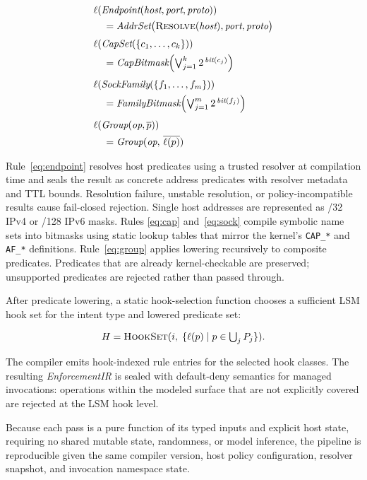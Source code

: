 \begin{align}
&\ell(\textit{Endpoint}(\textit{host}, \textit{port}, \textit{proto}))
  \notag\\
&\quad= \textit{AddrSet}\bigl(
    \textsc{Resolve}(\textit{host}),
    \textit{port},
    \textit{proto}
  \bigr)
  \label{eq:endpoint} \\[3pt]
&\ell(\textit{CapSet}(\{c_1, \ldots, c_k\}))
  \notag\\
&\quad= \textit{CapBitmask}\!\left(
    \textstyle\bigvee_{j=1}^{k} 2^{\,\textit{bit}(c_j)}
  \right)
  \label{eq:cap} \\[3pt]
&\ell(\textit{SockFamily}(\{f_1, \ldots, f_m\}))
  \notag\\
&\quad= \textit{FamilyBitmask}\!\left(
    \textstyle\bigvee_{j=1}^{m} 2^{\,\textit{bit}(f_j)}
  \right)
  \label{eq:sock} \\[3pt]
&\ell(\textit{Group}(\textit{op}, \overline{p}))
  \notag\\
&\quad= \textit{Group}(\textit{op},\, \overline{\ell(p)})
  \label{eq:group}
\end{align}

\noindent Rule~\eqref{eq:endpoint} resolves host predicates using a trusted
resolver at compilation time and seals the result as concrete address
predicates with resolver metadata and TTL bounds. Resolution failure, unstable
resolution, or policy-incompatible results cause fail-closed rejection. Single
host addresses are represented as /32 IPv4 or /128 IPv6 masks. Rules
\eqref{eq:cap} and~\eqref{eq:sock} compile symbolic name sets into bitmasks
using static lookup tables that mirror the kernel's \texttt{CAP\_*} and
\texttt{AF\_*} definitions. Rule~\eqref{eq:group} applies lowering recursively
to composite predicates. Predicates that are already kernel-checkable are
preserved; unsupported predicates are rejected rather than passed through.

After predicate lowering, a static hook-selection function chooses a sufficient
LSM hook set for the intent type and lowered predicate set:

\[
H = \textsc{HookSet}(i,\; \{\ell(p) \mid p \in \textstyle\bigcup_j P_j\}) .
\]

\noindent The compiler emits hook-indexed rule entries for the selected hook
classes. The resulting \textit{EnforcementIR} is sealed with default-deny
semantics for managed invocations: operations within the modeled surface that
are not explicitly covered are rejected at the LSM hook level.

Because each pass is a pure function of its typed inputs and explicit host
state, requiring no shared mutable state, randomness, or model inference, the
pipeline is reproducible given the same compiler version, host policy
configuration, resolver snapshot, and invocation namespace state.

